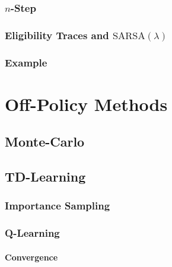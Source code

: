             \subsubsection{\(n\)-Step} %

            \subsubsection{Eligibility Traces and \( \text{SARSA}(\lambda) \)} %

            \subsubsection{Example} %

    \section{Off-Policy Methods} %

        \subsection{Monte-Carlo} %

        \subsection{TD-Learning} %

            \subsubsection{Importance Sampling} %

            \subsubsection{Q-Learning} %

                \paragraph{Convergence} %

